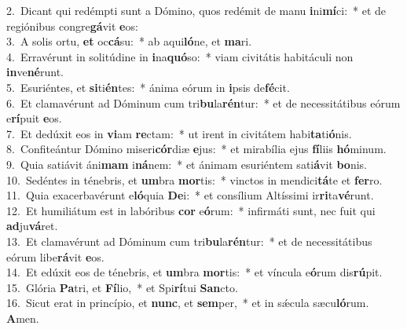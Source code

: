 {2.~}Dicant qui redémpti sunt a Dómino, quos redémit de manu \textbf{i}ni\textbf{mí}ci:~* et de regiónibus congre\textbf{gá}vit \textbf{e}os:\\
{3.~}A solis ortu, \textbf{et} oc\textbf{cá}su:~* ab aqui\textbf{ló}ne, et \textbf{ma}ri.\\
{4.~}Erravérunt in solitúdine in \textbf{i}na\textbf{quó}so:~* viam civitátis habitáculi non \textbf{in}ve\textbf{né}runt.\\
{5.~}Esuriéntes, et \textbf{si}ti\textbf{én}tes:~* ánima eórum in \textbf{i}psis de\textbf{fé}cit.\\
{6.~}Et clamavérunt ad Dóminum cum tri\textbf{bu}la\textbf{rén}tur:~* et de necessitátibus eórum e\textbf{rí}puit \textbf{e}os.\\
{7.~}Et dedúxit eos in \textbf{vi}am \textbf{re}ctam:~* ut irent in civitátem habi\textbf{ta}ti\textbf{ó}nis.\\
{8.~}Confiteántur Dómino miseri\textbf{cór}diæ \textbf{e}jus:~* et mirabília ejus \textbf{fí}liis \textbf{hó}minum.\\
{9.~}Quia satiávit áni\textbf{mam} i\textbf{ná}nem:~* et ánimam esuriéntem sati\textbf{á}vit \textbf{bo}nis.\\
{10.~}Sedéntes in ténebris, et \textbf{um}bra \textbf{mor}tis:~* vinctos in mendici\textbf{tá}te et \textbf{fer}ro.\\
{11.~}Quia exacerbavérunt e\textbf{ló}quia \textbf{De}i:~* et consílium Altíssimi ir\textbf{ri}ta\textbf{vé}runt.\\
{12.~}Et humiliátum est in labóribus \textbf{cor} e\textbf{ó}rum:~* infirmáti sunt, nec fuit qui \textbf{ad}ju\textbf{vá}ret.\\
{13.~}Et clamavérunt ad Dóminum cum tri\textbf{bu}la\textbf{rén}tur:~* et de necessitátibus eórum libe\textbf{rá}vit \textbf{e}os.\\
{14.~}Et edúxit eos de ténebris, et \textbf{um}bra \textbf{mor}tis:~* et víncula e\textbf{ó}rum dis\textbf{rú}pit.\\
{15.~}Glória \textbf{Pa}tri, et \textbf{Fí}lio,~* et Spi\textbf{rí}tui \textbf{San}cto.\\
{16.~}Sicut erat in princípio, et \textbf{nunc}, et \textbf{sem}per,~* et in sǽcula sæcu\textbf{ló}rum. \textbf{A}men.\\
